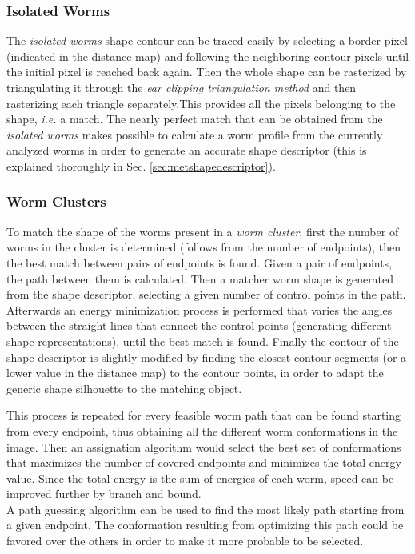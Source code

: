 \subsubsection*{Isolated Worms}
The \emph{isolated worms} shape contour can be traced easily by selecting a border pixel
(indicated in the distance map) and following the neighboring contour pixels until the
initial pixel is reached back again. Then the whole shape can be rasterized by 
triangulating it through the \emph{ear clipping triangulation method} and then rasterizing
each triangle separately.This provides all the pixels belonging to the shape, 
\emph{i.e.} a match.
The nearly perfect match that can be obtained from the \emph{isolated worms} makes 
possible to calculate a worm profile from the currently analyzed worms in order to
generate an accurate shape descriptor (this is explained thoroughly in 
Sec. \ref{sec:metshapedescriptor}).

\subsubsection*{Worm Clusters}
To match the shape of the worms present in a \emph{worm cluster}, first the number of 
worms in the cluster is determined (follows from the number of
endpoints), then the best match between pairs of endpoints is found. Given a pair of 
endpoints, the path between them is calculated. Then a matcher worm shape is generated
from the shape descriptor, selecting a given number of control points in the path.
Afterwards an energy minimization process is performed that varies the angles between the 
straight lines that connect the control points (generating different shape representations),
until the best match is found. Finally the contour of the shape descriptor is slightly 
modified by finding the closest contour segments (or a lower value in the distance map)
to the contour points, in order to adapt the generic shape silhouette to 
the matching object. 

This process is repeated for every feasible worm path that can be found starting from
every endpoint, thus obtaining all the different worm conformations in the image.
Then an assignation algorithm would select the best set of conformations that maximizes
the number of covered endpoints and minimizes the total energy value. 
Since the total energy is the sum of energies of each worm, speed can be improved further 
by branch and bound.\\
A path guessing algorithm can be used to find the most likely path 
starting from a given endpoint. The conformation resulting from 
optimizing this path could be favored over the others in order to make
it more probable to be selected.\\

